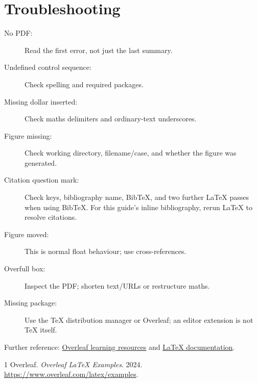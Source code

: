 \documentclass[11pt]{article}
\begin{document}
\section{Troubleshooting}
\begin{description}
\item[No PDF:] Read the first error, not just the last summary.
\item[Undefined control sequence:] Check spelling and required packages.
\item[Missing dollar inserted:] Check maths delimiters and ordinary-text underscores.
\item[Figure missing:] Check working directory, filename/case, and whether
the figure was generated.
\item[Citation question mark:] Check keys, bibliography name, BibTeX, and
two further LaTeX passes when using BibTeX. For this guide's inline
bibliography, rerun LaTeX to resolve citations.
\item[Figure moved:] This is normal float behaviour; use cross-references.
\item[Overfull box:] Inspect the PDF; shorten text/URLs or restructure maths.
\item[Missing package:] Use the TeX distribution manager or Overleaf;
an editor extension is not TeX itself.
\end{description}
Further reference:
\href{https://www.overleaf.com/learn}{Overleaf learning resources} and
\href{https://www.latex-project.org/help/documentation/}{LaTeX documentation}.
\begin{thebibliography}{1}
Overleaf.
\emph{Overleaf LaTeX Examples}.
2024.
\url{https://www.overleaf.com/latex/examples}.
\end{thebibliography}
\end{document}
